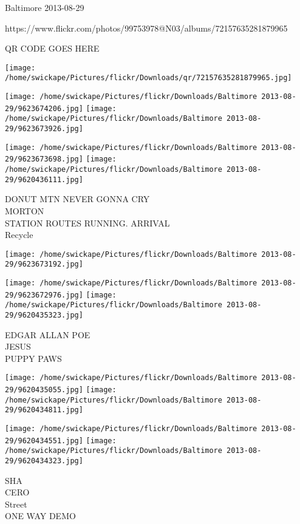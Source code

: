 \documentclass[10pt,letterpaper]{article}
\begin{document}
Baltimore 2013-08-29

https://www.flickr.com/photos/99753978@N03/albums/72157635281879965

QR CODE GOES HERE

\texttt{[image: /home/swickape/Pictures/flickr/Downloads/qr/72157635281879965.jpg]}
\pagebreak

\texttt{[image: /home/swickape/Pictures/flickr/Downloads/Baltimore 2013-08-29/9623674206.jpg]}
\texttt{[image: /home/swickape/Pictures/flickr/Downloads/Baltimore 2013-08-29/9623673926.jpg]}

\texttt{[image: /home/swickape/Pictures/flickr/Downloads/Baltimore 2013-08-29/9623673698.jpg]}
\texttt{[image: /home/swickape/Pictures/flickr/Downloads/Baltimore 2013-08-29/9620436111.jpg]}

DONUT MTN NEVER GONNA CRY\\
MORTON\\
STATION ROUTES RUNNING. ARRIVAL\\
Recycle\\
\pagebreak

\texttt{[image: /home/swickape/Pictures/flickr/Downloads/Baltimore 2013-08-29/9623673192.jpg]}

\vspace{0.25in}
\texttt{[image: /home/swickape/Pictures/flickr/Downloads/Baltimore 2013-08-29/9623672976.jpg]}
\texttt{[image: /home/swickape/Pictures/flickr/Downloads/Baltimore 2013-08-29/9620435323.jpg]}

EDGAR ALLAN POE\\
JESUS\\
PUPPY PAWS\\
\pagebreak

\texttt{[image: /home/swickape/Pictures/flickr/Downloads/Baltimore 2013-08-29/9620435055.jpg]}
\texttt{[image: /home/swickape/Pictures/flickr/Downloads/Baltimore 2013-08-29/9620434811.jpg]}

\texttt{[image: /home/swickape/Pictures/flickr/Downloads/Baltimore 2013-08-29/9620434551.jpg]}
\texttt{[image: /home/swickape/Pictures/flickr/Downloads/Baltimore 2013-08-29/9620434323.jpg]}

SHA\\
CERO\\
Street\\
ONE WAY DEMO\\
\pagebreak
\end{document}
